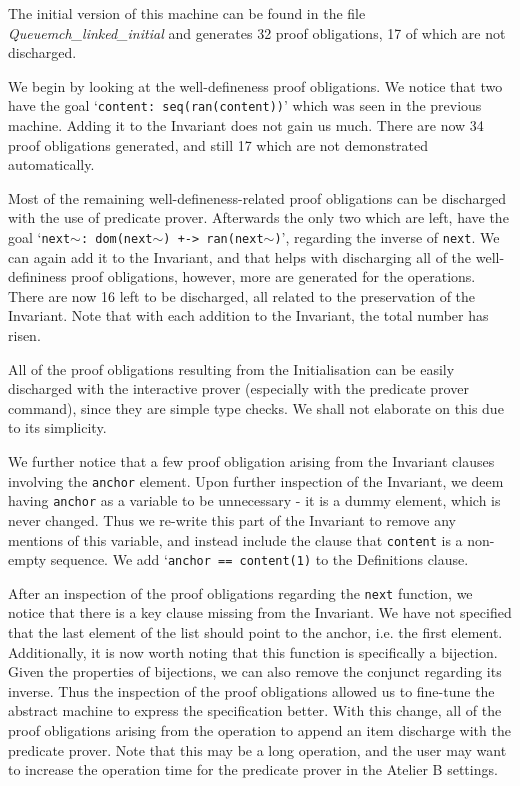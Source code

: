 \documentclass[12pt,journal,duplex]{IEEEtran}
\begin{document}
	The initial version of this machine can be found in the file \emph{Queuemch\_linked\_initial} and generates 32 proof obligations, 17 of which are not discharged.

	We begin by looking at the well-defineness proof obligations. We notice that two have the goal `\texttt{content: seq(ran(content))}' which was seen in the previous machine. Adding it to the Invariant does not gain us much. There are now 34 proof obligations generated, and still 17 which are not demonstrated automatically.

	Most of the remaining well-defineness-related proof obligations can be discharged with the use of predicate prover. Afterwards the only two which are left, have the goal `\texttt{next}$\sim$\texttt{: dom(next}$\sim$\texttt{) +-> ran(next}$\sim$\texttt{)}', regarding the inverse of \texttt{next}. We can again add it to the Invariant, and that helps with discharging all of the well-defininess proof obligations, however, more are generated for the operations. There are now 16 left to be discharged, all related to the preservation of the Invariant. Note that with each addition to the Invariant, the total number has risen.

	All of the proof obligations resulting from the Initialisation can be easily discharged with the interactive prover (especially with the predicate prover command), since they are simple type checks. We shall not elaborate on this due to its simplicity.

	We further notice that a few proof obligation arising from the Invariant clauses involving the \texttt{anchor} element. Upon further inspection of the Invariant, we deem having \texttt{anchor} as a variable to be unnecessary - it is a dummy element, which is never changed. Thus we re-write this part of the Invariant to remove any mentions of this variable, and instead include the clause that \texttt{content} is a non-empty sequence. We add `\texttt{anchor == content(1)} to the Definitions clause.

	After an inspection of the proof obligations regarding the \texttt{next} function, we notice that there is a key clause missing from the Invariant. We have not specified that the last element of the list should point to the anchor, i.e. the first element. Additionally, it is now worth noting that this function is specifically a bijection. Given the properties of bijections, we can also remove the conjunct regarding its inverse. Thus the inspection of the proof obligations allowed us to fine-tune the abstract machine to express the specification better. With this change, all of the proof obligations arising from the operation to append an item discharge with the predicate prover. Note that this may be a long operation, and the user may want to increase the operation time for the predicate prover in the Atelier B settings.
\end{document}
